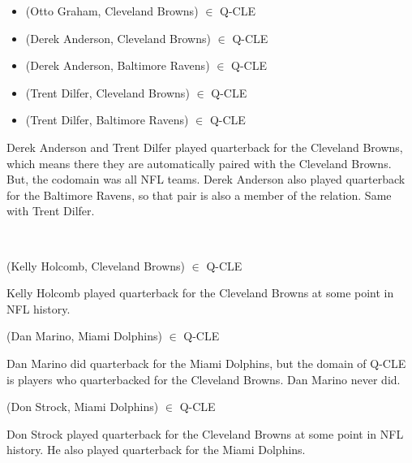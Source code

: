 \documentclass{ximera}
\begin{document}
\begin{example}
\begin{itemize}
\item (Otto Graham, Cleveland Browns) $\in$ Q-CLE
\item (Derek Anderson, Cleveland Browns) $\in$ Q-CLE
\item (Derek Anderson, Baltimore Ravens) $\in$ Q-CLE
\item (Trent Dilfer, Cleveland Browns) $\in$ Q-CLE
\item (Trent Dilfer, Baltimore Ravens) $\in$ Q-CLE
\end{itemize}

Derek Anderson and Trent Dilfer played quarterback for the Cleveland Browns, which means there they are automatically paired with the Cleveland Browns.  But, the codomain was all NFL teams.  Derek Anderson also played quarterback for the Baltimore Ravens, so that pair is also a member of the relation.  Same with Trent Dilfer.


\end{example}


\quad \\


\begin{problem}  (Kelly Holcomb, Cleveland Browns) $\in$ Q-CLE
\begin{feedback}
Kelly Holcomb played quarterback for the Cleveland Browns at some point in NFL history.
\end{feedback}
\end{problem}



\begin{problem}  (Dan Marino, Miami Dolphins) $\in$ Q-CLE
\begin{feedback}
Dan Marino did quarterback for the Miami Dolphins, but the domain of Q-CLE is players who quarterbacked for the Cleveland Browns.  Dan Marino never did. 
\end{feedback}
\end{problem}




\begin{problem}  (Don Strock, Miami Dolphins) $\in$ Q-CLE
\begin{feedback}
Don Strock played quarterback for the Cleveland Browns at some point in NFL history. He also played quarterback for the Miami Dolphins.
\end{feedback}
\end{problem}
\end{document}
